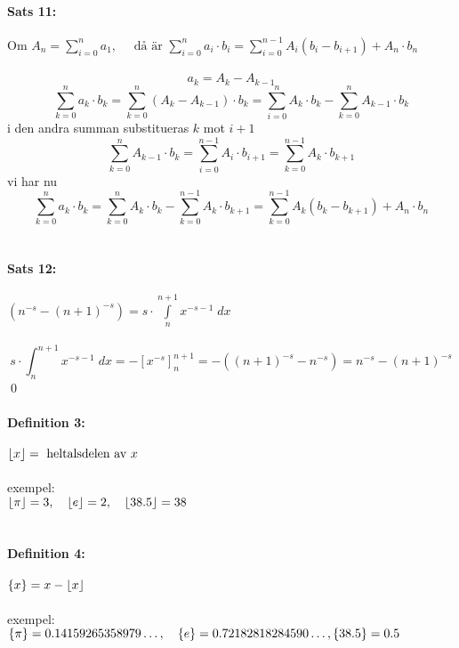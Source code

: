 \documentclass{article}
\DeclarePairedDelimiter{\floor}{\lfloor}{\rfloor}
\DeclarePairedDelimiter{\fpart} { \{ } { \} }
\begin{document}
\paragraph{Sats 11:} %
Om $A_n = \sum\limits_{i = 0}^n a_1, \quad \text{ då är } \sum\limits_{i = 0}^n a_i \cdot b_i = 
		\sum\limits_{i = 0}^{n - 1} A_i (b_i - b_{i + 1}) + A_n \cdot b_n$\\
\\
\[ a_k = A_k - A_{k - 1} \]
\[
	\sum_{k = 0}^n a_k \cdot b_k =  \sum_{k = 0}^n (A_k - A_{k - 1}) \cdot b_k = \sum_{i = 0}^n A_k \cdot b_k - 
		\sum_{k = 0}^n A_{k - 1} \cdot b_k
\]
i den andra summan substitueras $k$ mot $i + 1$
\[
	\sum_{k = 0}^n A_{k - 1} \cdot b_k = \sum_{i = 0}^{n - 1} A_i \cdot b_{i + 1} = \sum_{k = 0}^{n - 1} A_k \cdot b_{k + 1}
\]
vi har nu
\[
	\sum_{k = 0}^n a_k \cdot b_k = \sum_{k = 0}^n A_k \cdot b_k - \sum_{k = 0}^{n - 1} A_k \cdot b_{k + 1} =
		\sum_{k = 0}^{n - 1} A_k (b_k - b_{k + 1}) + A_n \cdot b_n
\]
\\
\paragraph{Sats 12:} $(n^{-s} - (n + 1)^{-s}) = s \cdot \int\limits_n^{n + 1} x^{-s - 1} \; dx$\\
\\
\[
	s \cdot \int_n^{n + 1} x^{-s - 1} \; dx = - [ x^{-s} ]_n^{n + 1} = - ((n + 1)^{-s} - n^{-s})
		= n^{-s} -(n + 1)^{-s}
\]
\hfill \qed
\\
\paragraph{Definition 3:} $\floor{x} = \text{ heltalsdelen av } x$\\
\\
exempel:\\
$\floor{\pi} = 3, \quad \floor{e} = 2, \quad \floor{38.5} = 38$\\
\\
\paragraph{Definition 4:} $\fpart{x} = x - \floor{x}$\\
\\
exempel:\\
$\fpart{\pi} = 0.14159265358979 \ldots, \quad \fpart{e} = 0.72182818284590 \ldots, \fpart{38.5} = 0.5$\\
\\
\end{document}
